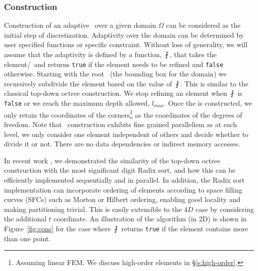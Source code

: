 \subsubsection{Construction} 

Construction of an adaptive \stri\ over a given domain $\Omega$ can be considered as the initial step of discretization. Adaptivity over the domain can be determined by user specified functions or specific constraint. Without loss of generality, we will assume that the adaptivity is defined by a function, $\fint$, that takes the element/\stra\ and returns \texttt{true} if the element needs to be refined and \texttt{false} otherwise. Starting with the root \stra\ (the bounding box for the domain) we recursively subdivide the element based on the value of $\fint$. This is similar to the classical top-down octree construction. We stop refining an element when $\fint$ is \texttt{false} or we reach the maximum depth allowed, $l_{max}$. Once the \stri is constructed, we only retain the coordinates of the corners\footnote{Assuming linear FEM. We discuss high-order elements in \S\ref{s:high-order}.} as the coordinates of the degrees of freedom. Note that \stri\ construction exhibits fine grained parallelism as at each level, we only consider one element independent of others and decide whether to divide it or not. There are no data dependencies or indirect memory accesses. 

In recent work \cite{FernandoDuplyakinSundar17}, we demonstrated the similarity of the top-down octree construction with the most significant digit Radix sort, and how this can be efficiently implemented sequentially and in parallel. In addition, the Radix sort implementation can incorporate ordering of elements according to space filling curves (SFCs) such as Morton or Hilbert ordering, enabling good locality and making partitioning trivial. This is easily extensible to the $4D$ case by considering the additional $t$ coordinate. An illustration of the algorithm (in 2D) is shown in Figure~\ref{fig:cons} for the case where $\fint$ returns \texttt{true} if the element contains more than one point.

